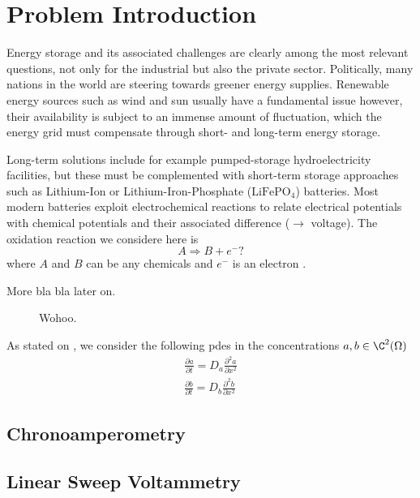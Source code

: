 \documentclass{prettytex/ox/mmsc-special-topic}
\begin{document}
  \pagebreak
  \pagestyle{normal}

  \tableofcontents
  \pagebreak

  \section{Problem Introduction}
  Energy storage and its associated challenges are clearly among the most relevant questions, not only for the industrial but also the private sector.
  Politically, many nations in the world are steering towards greener energy supplies.
  Renewable energy sources such as wind and sun usually have a fundamental issue however, their availability is subject to an immense amount of fluctuation, which the energy grid must compensate through short- and long-term energy storage.

  Long-term solutions include for example pumped-storage hydroelectricity facilities, but these must be complemented with short-term storage approaches such as Lithium-Ion or Lithium-Iron-Phosphate ($\text{LiFePO}_4$) batteries.
  Most modern batteries exploit electrochemical reactions to relate electrical potentials with chemical potentials and their associated difference ($\rightarrow$ voltage).
  The oxidation reaction we considere here is
  $$A \Rightarrow B + e^-?$$
  where $A$ and $B$ can be any chemicals and $e^-$ is an electron \parencite{Gavaghan2000Jan}.

  More bla bla later on.

  \begin{figure}[H]
    \centering
    \caption{Wohoo.}
    \label{fig:battery-schema}
  \end{figure}

  As stated on , we consider the following \gls{pde}s in the concentrations $a, b \in \C^2(\Omega)$
  \begin{align}
    \label{eq:pde-a} \frac{\partial a}{\partial t} = D_a \frac{\partial^2 a}{\partial x^2} \\
    \label{eq:pde-b} \frac{\partial b}{\partial t} = D_b \frac{\partial^2 b}{\partial x^2}
  \end{align}

  \subsection{Chronoamperometry}
  \subsection{Linear Sweep Voltammetry}
\end{document}
